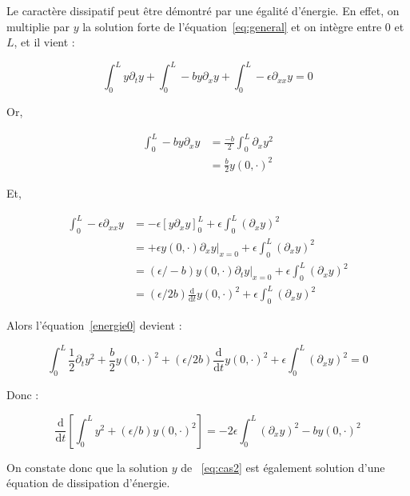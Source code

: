 \documentclass[a4paper]{article}
\newcommand{\dep}{b}
\begin{document}
\begin{remarque}
Le caractère dissipatif peut être démontré par une égalité d'énergie.
En effet, on multiplie par $y$ la solution forte de l'équation~\eqref{eq:general} 
et on intègre entre $0$ et $L$, et il vient :


\begin{equation}
	\label{energie0}
	 \int_0^L y \partial_t y 
+ \int_0^L -\dep y \partial_x y 
+ \int_0^L -\epsilon \partial_{xx} y =0
\end{equation}

Or,

\[
\begin{split}
\displaystyle \int_0^L -\dep y \partial_x y &= \frac{-\dep}{2} \int_0^L \partial_x y^2\\
                                        &=  \frac{\dep}{2} y(0,\cdot)^2
\end{split}
\]

Et,

\[
\begin{split}
	\int_0^L -\epsilon \partial_{xx} y & = -\epsilon [y \partial_x y]_0^L 
                                    + \epsilon \int_0^L (\partial_x y)^2 \\
									& = +\epsilon y(0,\cdot) \partial_x y|_{x=0} 
									+ \epsilon \int_0^L (\partial_x y)^2 \\
									& = (\epsilon/-\dep) y(0,\cdot) \partial_t y|_{x=0} 
									+ \epsilon \int_0^L(\partial_x y)^2\\
									& = (\epsilon/2\dep) \frac{\mathrm{d}}{\mathrm{d}t} y(0,\cdot)^2
									+ \epsilon \int_0^L (\partial_x y)^2
\end{split}
\]



Alors l'équation~\eqref{energie0} devient :

\[
\displaystyle \int_0^L \frac{1}{2}\partial_t y^2 
+ \frac{\dep}{2} y(0,\cdot)^2
+ (\epsilon/2\dep) \frac{\mathrm{d}}{\mathrm{d}t} y(0,\cdot)^2
+ \epsilon \int_0^L (\partial_x y)^2 =0
\]

Donc :

\begin{equation}
	\displaystyle \frac{\mathrm{d}}{\mathrm{d}t}
	[\int_0^L y^2 
	+(\epsilon/\dep) y(0,\cdot)^2]
	= -2\epsilon\int_0^L (\partial_x y)^2 - \dep y(0,\cdot)^2
\end{equation}

On constate donc que la solution $y$ de ~\eqref{eq:cas2} est également solution 
d'une équation de dissipation d'énergie.

\end{remarque}
\end{document}
